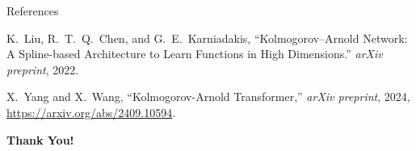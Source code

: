 \documentclass{beamer}
\begin{document}
\begin{frame}{References}
    \footnotesize
    \begin{thebibliography}{1}
        K.~Liu, R.~T.~Q.~Chen, and G.~E.~Karniadakis,
        \newblock ``Kolmogorov--Arnold Network: A Spline-based Architecture to Learn Functions in High Dimensions.''
        \newblock \emph{arXiv preprint}, 2022.
        
        X.~Yang and X.~Wang,
        \newblock ``Kolmogorov-Arnold Transformer,''
        \newblock \emph{arXiv preprint}, 2024,
        \url{https://arxiv.org/abs/2409.10594}.
    \end{thebibliography}
\end{frame}

\begin{frame}
    \centering
    \Large{\textbf{Thank You!}}
\end{frame}
\end{document}
